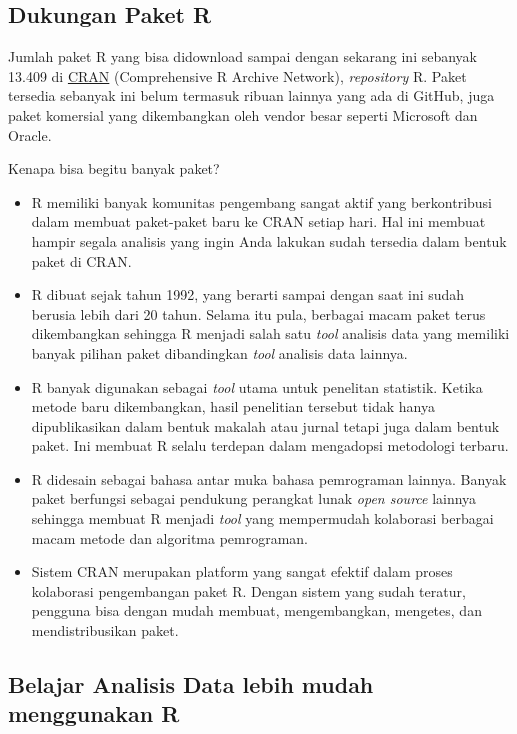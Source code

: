 \documentclass[openany]{book}
\begin{document}
\subsection{Dukungan Paket R}\label{dukungan-paket-r}

Jumlah paket R yang bisa didownload sampai dengan sekarang ini sebanyak
13.409 di \href{https://cran.r-project.org/}{CRAN} (Comprehensive R
Archive Network), \emph{repository} R. Paket tersedia sebanyak ini belum
termasuk ribuan lainnya yang ada di GitHub, juga paket komersial yang
dikembangkan oleh vendor besar seperti Microsoft dan Oracle.

Kenapa bisa begitu banyak paket?

\begin{itemize}
\item
  R memiliki banyak komunitas pengembang sangat aktif yang berkontribusi
  dalam membuat paket-paket baru ke CRAN setiap hari. Hal ini membuat
  hampir segala analisis yang ingin Anda lakukan sudah tersedia dalam
  bentuk paket di CRAN.
\item
  R dibuat sejak tahun 1992, yang berarti sampai dengan saat ini sudah
  berusia lebih dari 20 tahun. Selama itu pula, berbagai macam paket
  terus dikembangkan sehingga R menjadi salah satu \emph{tool} analisis
  data yang memiliki banyak pilihan paket dibandingkan \emph{tool}
  analisis data lainnya.
\item
  R banyak digunakan sebagai \emph{tool} utama untuk penelitan
  statistik. Ketika metode baru dikembangkan, hasil penelitian tersebut
  tidak hanya dipublikasikan dalam bentuk makalah atau jurnal tetapi
  juga dalam bentuk paket. Ini membuat R selalu terdepan dalam
  mengadopsi metodologi terbaru.
\item
  R didesain sebagai bahasa antar muka bahasa pemrograman lainnya.
  Banyak paket berfungsi sebagai pendukung perangkat lunak \emph{open
  source} lainnya sehingga membuat R menjadi \emph{tool} yang
  mempermudah kolaborasi berbagai macam metode dan algoritma
  pemrograman.
\item
  Sistem CRAN merupakan platform yang sangat efektif dalam proses
  kolaborasi pengembangan paket R. Dengan sistem yang sudah teratur,
  pengguna bisa dengan mudah membuat, mengembangkan, mengetes, dan
  mendistribusikan paket.
\end{itemize}

\subsection{Belajar Analisis Data lebih mudah menggunakan
R}\label{belajar-analisis-data-lebih-mudah-menggunakan-r}
\end{document}
